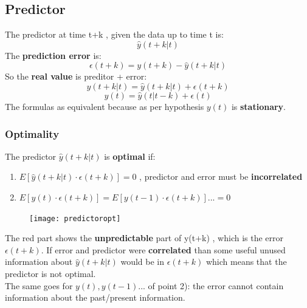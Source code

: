 \subsection{Predictor}
The predictor at time t+k , given the data up to time t is:
$$ \hat{y}(t+k|t) $$
The \textbf{prediction error} is: 
$$  \epsilon(t+k) = y(t+k)- \hat{y}(t + k|t)$$
So the \textbf{real value } is preditor + error:
$$ y(t+k|t) = \hat{y}(t+k|t) + \epsilon(t+k)$$
$$ y(t) = \hat{y}(t|t-k) + \epsilon(t) $$
The formulas as equivalent because as per hypothesis $y(t)$ is \textbf{stationary}.
\subsubsection{Optimality}
The predictor $ \hat{y}(t+k|t) $ is \textbf{optimal} if:
\begin{enumerate}
\item $ E[\hat{y}(t+k|t) \cdot \epsilon(t+k)]=0 $ , predictor and error must be \textbf{incorrelated}
\item $ E[y(t) \cdot \epsilon(t+k)] = E[y(t-1) \cdot \epsilon(t+k)]... = 0$
\end{enumerate}
\begin{figure}[H]
 \centering
  \texttt{[image: predictoropt]}
\end{figure}
The red part shows the \textbf{unpredictable} part of y(t+k) , which is the error $\epsilon(t+k)$. If error and predictor were \textbf{correlated} than some useful unused information about $\hat{y}(t+k|t)$ would be in $\epsilon(t+k)$ which means that the predictor is not optimal.\\
The same goes for $y(t) , y(t-1)...$ of point 2): the error cannot contain information about the past/present information.\\


